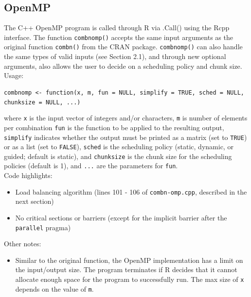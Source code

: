 \subsection{OpenMP}

The C++ OpenMP program is called through R via .Call() using the Rcpp interface. The function \texttt{combnomp()} accepts the same input arguments as the original function \texttt{combn()} from the CRAN package. \texttt{combnomp()} can also handle the same types of valid inputs (see Section 2.1), and through new optional arguments, also allows the user to decide on a scheduling policy and chunk size.\\
\null
Usage:\\
\null

\texttt{combnomp <- function(x, m, fun = NULL, simplify = TRUE, sched = NULL, chunksize = NULL, ...)}\\
\null

where \texttt{x} is the input vector of integers and/or characters, \texttt{m} is number of elements per combination
\texttt{fun} is the function to be applied to the resulting output, \texttt{simplify} indicates whether the output must be printed as a matrix (set to \texttt{TRUE}) or as a list (set to \texttt{FALSE}), \texttt{sched} is the scheduling policy (static, dynamic, or guided; default is static), and  \texttt{chunksize} is the chunk size for the scheduling policies (default is 1), and \texttt{...} are the parameters for \texttt{fun}.\\

\null
Code highlights:\\
\begin{itemize}
\item Load balancing algorithm (lines 101 - 106 of \texttt{combn-omp.cpp}, described  in the next section)
\item No critical sections or barriers (except for the implicit barrier after the \texttt{parallel} pragma)
\end{itemize}
Other notes:
\begin{itemize}
\item Similar to the original function, the OpenMP implementation has a limit on the input/output size. The program terminates if R decides that it cannot allocate enough space for the program to successfully run. The max size of \texttt{x} depends on the value of \texttt{m}.
\end{itemize}

